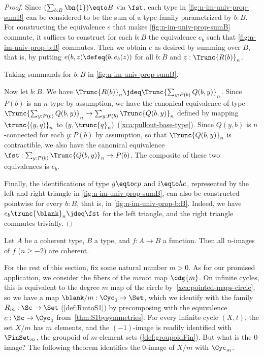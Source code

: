 \begin{proof}
Since $(\sum_{b:B}\bn{1}) \eqto B$ via $\fst$,
each type in \cref{fig:n-im-univ-prop-sumB}
can be considered to be the sum of a type family parametrized by $b:B$.
For constructing the equivalence $e$ that makes
\cref{fig:n-im-univ-prop-sumB} commute, it suffices to
construct for each $b:B$ the equivalence $e_b$ such that
\cref{fig:n-im-univ-prop-b:B} commutes.
Then we obtain $e$ as desired by summing over $B$, that is,
by putting $e(b,z) \defeq (b,e_b(z))$ for all $b:B$ and $z:\Trunc{R(b)}_n$.

\begin{marginfigure}
  \noindent{}
\caption{Taking summands for $b:B$ in \cref{fig:n-im-univ-prop-sumB}.}
\label{fig:n-im-univ-prop-b:B}
\end{marginfigure}

Now let $b:B$. We have $\Trunc{R(b)}_n \jdeq \Trunc{\sum_{y:P(b)} Q(b,y)}_n$.
Since $P(b)$ is an $n$-type by assumption, we have the canonical equivalence
of type $\Trunc{\sum_{y:P(b)} Q(b,y)}_n\to\sum_{y:P(b)}\Trunc{Q(b,y)}_n$ defined
by mapping $\trunc{(y,q)}_n$ to $(y,\trunc{q}_n)$
(\cf \cref{xca:pullout-base-type}).
Since $Q(y,b)$ is $n$-connected for each $y:P(b)$ by assumption,
so that $\Trunc{Q(b,y)}_n$ is contractible,
we also have the canonical equivalence
$\fst: \sum_{y:P(b)}\Trunc{Q(b,y)}_n \to P(b)$.
The composite of these two equivalences is $e_b$.

Finally, the identifications of type $g\eqto ep$ and $i\eqto he$,
represented by the left and right triangle in \cref{fig:n-im-univ-prop-sumB},
can also be constructed pointwise for every $b:B$, that is,
in \cref{fig:n-im-univ-prop-b:B}. Indeed, we have
$e_b \trunc{\blank}_n \jdeq \fst$ for the left triangle,
and the right triangle commutes trivially.
\end{proof}

\begin{xca}\label{xca:im_preserves_coh}
Let $A$ be a coherent type, $B$ a type, and $f:A\to B$ a function.
Then all $n$-images of $f$ ($n\geq-2$) are coherent.
\end{xca}

For the rest of this section, fix some natural number $m>0$. As for our
promised application, we consider the fibers of the $m$\th root map $\cdg{m}$.
On infinite cycles, this is equivalent to the degree $m$ map
of the circle by~\cref{xca:pointed-maps-circle}, so we have a map
$\blank/m : \Cyc_0 \to \Set$, which we identify with the family
$R_m : \Sc \to \Set$ (\cref{def:RmtoS1}) by precomposing with the equivalence
$c : \Sc \to \Cyc_0$ from~\cref{thm:S1bysymmetries}.
For every infinite cycle $(X,t)$, the set $X/m$ has $m$ elements,
and the $(-1)$-image is readily identified with $\FinSet_m$,
the groupoid of $m$-element sets (\cref{def:groupoidFin}).
But what is the $0$-image? The following theorem identifies
the $0$-image of $X/m$ with $\Cyc_m$.

